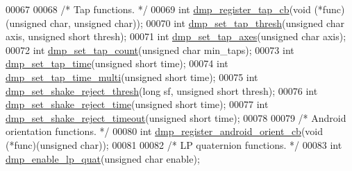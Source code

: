 \begin{DoxyCode}
00067 
00068 \textcolor{comment}{/* Tap functions. */}
00069 \textcolor{keywordtype}{int} \hyperlink{group___d_r_i_v_e_r_s_ga8a2df36126e34b78863e3acf1249d814}{dmp\_register\_tap\_cb}(\textcolor{keywordtype}{void} (*func)(\textcolor{keywordtype}{unsigned} \textcolor{keywordtype}{char}, \textcolor{keywordtype}{unsigned} \textcolor{keywordtype}{char}));
00070 \textcolor{keywordtype}{int} \hyperlink{group___d_r_i_v_e_r_s_ga15da67c0a6c94e0cdaceb8b165e13af9}{dmp\_set\_tap\_thresh}(\textcolor{keywordtype}{unsigned} \textcolor{keywordtype}{char} axis, \textcolor{keywordtype}{unsigned} \textcolor{keywordtype}{short} thresh);
00071 \textcolor{keywordtype}{int} \hyperlink{group___d_r_i_v_e_r_s_ga66bc5c8fc26fcb498df53fc62aa87e4f}{dmp\_set\_tap\_axes}(\textcolor{keywordtype}{unsigned} \textcolor{keywordtype}{char} axis);
00072 \textcolor{keywordtype}{int} \hyperlink{group___d_r_i_v_e_r_s_ga819f947b2cb107ada7b9a94c41be0dad}{dmp\_set\_tap\_count}(\textcolor{keywordtype}{unsigned} \textcolor{keywordtype}{char} min\_taps);
00073 \textcolor{keywordtype}{int} \hyperlink{group___d_r_i_v_e_r_s_ga97466067f4a23368f4d7e2547fe359d9}{dmp\_set\_tap\_time}(\textcolor{keywordtype}{unsigned} \textcolor{keywordtype}{short} time);
00074 \textcolor{keywordtype}{int} \hyperlink{group___d_r_i_v_e_r_s_gaeca250a90eb816eb2609229849481337}{dmp\_set\_tap\_time\_multi}(\textcolor{keywordtype}{unsigned} \textcolor{keywordtype}{short} time);
00075 \textcolor{keywordtype}{int} \hyperlink{group___d_r_i_v_e_r_s_ga62efdae1330d5bcaf4c75b069ded0ed0}{dmp\_set\_shake\_reject\_thresh}(\textcolor{keywordtype}{long} sf, \textcolor{keywordtype}{unsigned} \textcolor{keywordtype}{short} thresh);
00076 \textcolor{keywordtype}{int} \hyperlink{group___d_r_i_v_e_r_s_ga09d7a6d90e1bd2e907f1866d850c5608}{dmp\_set\_shake\_reject\_time}(\textcolor{keywordtype}{unsigned} \textcolor{keywordtype}{short} time);
00077 \textcolor{keywordtype}{int} \hyperlink{group___d_r_i_v_e_r_s_ga5d44d1a32535000e6902cdc5224d1b54}{dmp\_set\_shake\_reject\_timeout}(\textcolor{keywordtype}{unsigned} \textcolor{keywordtype}{short} time);
00078 
00079 \textcolor{comment}{/* Android orientation functions. */}
00080 \textcolor{keywordtype}{int} \hyperlink{group___d_r_i_v_e_r_s_ga2e66a02d29ec89466cf339587592943c}{dmp\_register\_android\_orient\_cb}(\textcolor{keywordtype}{void} (*func)(\textcolor{keywordtype}{unsigned} \textcolor{keywordtype}{char}));
00081 
00082 \textcolor{comment}{/* LP quaternion functions. */}
00083 \textcolor{keywordtype}{int} \hyperlink{group___d_r_i_v_e_r_s_ga4ee4339b79a58558d121ba8206056394}{dmp\_enable\_lp\_quat}(\textcolor{keywordtype}{unsigned} \textcolor{keywordtype}{char} enable);

\end{DoxyCode}
